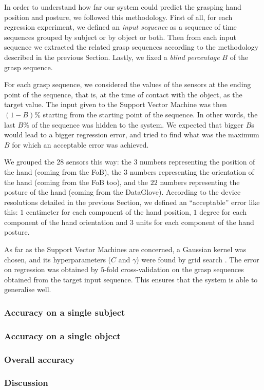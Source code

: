 In order to understand how far our system could predict the grasping
hand position and posture, we followed this methodology. First of all,
for each regression experiment, we defined an \emph{input sequence} as
a sequence of time sequences grouped by subject or by object or
both. Then from each input sequence we extracted the related grasp
sequences according to the methodology described in the previous
Section. Lastly, we fixed a \emph{blind percentage} $B$ of the
grasp sequence.

For each grasp sequence, we considered the values of the sensors at
the ending point of the sequence, that is, at the time of contact with
the object, as the target value. The input given to the Support Vector
Machine was then $(1-B)\%$ starting from the starting point of the
sequence. In other words, the last $B\%$ of the sequence was hidden to
the system. We expected that bigger $B$s would lead to a bigger
regression error, and tried to find what was the maximum $B$ for which
an acceptable error was achieved.

We grouped the $28$ sensors this way: the $3$ numbers representing the
position of the hand (coming from the FoB), the $3$ numbers
representing the orientation of the hand (coming from the FoB too),
and the $22$ numbers representing the posture of the hand (coming from
the DataGlove). According to the device resolutions detailed in the
previous Section, we defined an ``acceptable'' error like this: $1$
centimeter for each component of the hand position, $1$ degree for
each component of the hand orientation and $3$ units for each
component of the hand posture.

As far as the Support Vector Machines are concerned, a Gaussian kernel
was chosen, and its hyperparameters ($C$ and $\gamma$) were found by
grid search \cite{...}. The error on regression was obtained by
$5$-fold cross-validation on the grasp sequences obtained from the
target input sequence. This ensures that the system is able to
generalise well.

\subsubsection*{Accuracy on a single subject}

\subsubsection*{Accuracy on a single object}

\subsubsection*{Overall accuracy}

\subsubsection*{Discussion}

